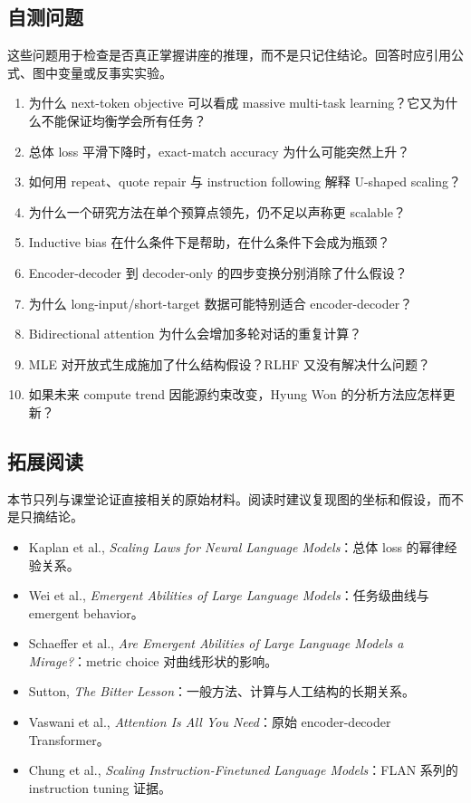 \documentclass[a4paper]{article}
\begin{document}
\subsection{自测问题}

这些问题用于检查是否真正掌握讲座的推理，而不是只记住结论。回答时应引用公式、图中变量或反事实实验。

\begin{enumerate}
  \item 为什么 next-token objective 可以看成 massive multi-task learning？它又为什么不能保证均衡学会所有任务？
  \item 总体 loss 平滑下降时，exact-match accuracy 为什么可能突然上升？
  \item 如何用 repeat、quote repair 与 instruction following 解释 U-shaped scaling？
  \item 为什么一个研究方法在单个预算点领先，仍不足以声称更 scalable？
  \item Inductive bias 在什么条件下是帮助，在什么条件下会成为瓶颈？
  \item Encoder-decoder 到 decoder-only 的四步变换分别消除了什么假设？
  \item 为什么 long-input/short-target 数据可能特别适合 encoder-decoder？
  \item Bidirectional attention 为什么会增加多轮对话的重复计算？
  \item MLE 对开放式生成施加了什么结构假设？RLHF 又没有解决什么问题？
  \item 如果未来 compute trend 因能源约束改变，Hyung Won 的分析方法应怎样更新？
\end{enumerate}

\subsection{拓展阅读}

本节只列与课堂论证直接相关的原始材料。阅读时建议复现图的坐标和假设，而不是只摘结论。

\begin{itemize}
  \item Kaplan et al., \emph{Scaling Laws for Neural Language Models}：总体 loss 的幂律经验关系。
  \item Wei et al., \emph{Emergent Abilities of Large Language Models}：任务级曲线与 emergent behavior。
  \item Schaeffer et al., \emph{Are Emergent Abilities of Large Language Models a Mirage?}：metric choice 对曲线形状的影响。
  \item Sutton, \emph{The Bitter Lesson}：一般方法、计算与人工结构的长期关系。
  \item Vaswani et al., \emph{Attention Is All You Need}：原始 encoder-decoder Transformer。
  \item Chung et al., \emph{Scaling Instruction-Finetuned Language Models}：FLAN 系列的 instruction tuning 证据。
\end{itemize}
\end{document}
